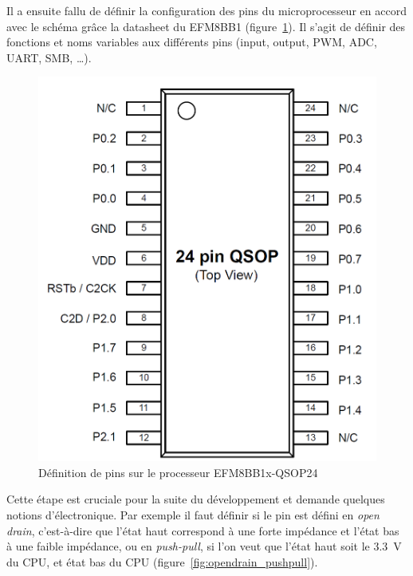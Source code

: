 \documentclass[a4paper, 12pt]{report}
\begin{document}
Il a ensuite fallu de définir la configuration des pins du microprocesseur en accord avec le schéma grâce la datasheet du EFM8BB1 (figure~\ref{fig:pins_definition}). Il s’agit de définir des fonctions et noms variables aux différents pins (input, output, PWM, ADC, UART, SMB, …).

\begin{figure}[H]
\centering
\includegraphics[scale=0.4]{figures/screenshots/pins_definition_EFM8BB.png}
\caption{Définition de pins sur le processeur EFM8BB1x-QSOP24\cite{EFM8BB1_datasheet}}
\label{fig:pins_definition}
\end{figure}

Cette étape est cruciale pour la suite du développement et demande quelques notions d’électronique. Par exemple il faut définir si le pin est défini en \emph{open drain}, c’est-à-dire que l’état haut correspond à une forte impédance et l’état bas à une faible impédance, ou en \emph{push-pull}, si l’on veut que l’état haut soit le \SI{3.3}{\volt} du CPU, et état bas du CPU (figure~\ref{fig:opendrain_pushpull}). 
\end{document}
